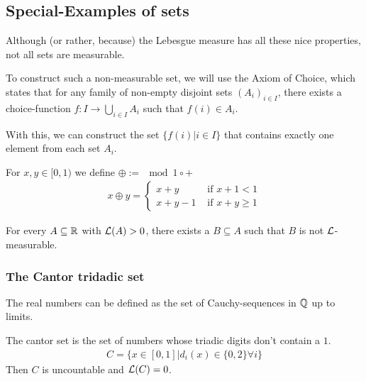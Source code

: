\subsection{Special-Examples of sets}
Although (or rather, because) the Lebesgue measure has all these nice properties, not all sets are measurable.

To construct such a non-measurable set, we will use the Axiom of Choice, which states that for any family of non-empty disjoint sets $(A_i)_{i \in I}$, there exists a choice-function $f: I \to \bigcup_{i \in I} A_i$ such that $f(i) \in A_i$.

With this, we can construct the set $\{f(i) \big\vert i \in I\}$ that contains exactly one element from each set $A_i$.

For $x,y \in [0,1)$ we define $\oplus := \mod 1 \circ +$
\begin{align*}
  x \oplus y = \left\{\begin{array}{ll}
    x+y & \text{ if } x + 1 < 1\\
    x + y - 1 & \text{ if } x + y \geq 1
  \end{array} \right.
\end{align*}


\begin{ex}[]
  For every $A \subseteq \mathbb{R}$ with $\mathcal{L}(A) > 0$, there exists a $B \subseteq A$ such that $B$ is not $\mathcal{L}$-measurable.
\end{ex}

\subsubsection*{The Cantor tridadic set}

The real numbers can be defined as the set of Cauchy-sequences in $\mathbb{Q}$ up to limits.

The cantor set is the set of numbers whose triadic digits don't contain a $1$.
\begin{align*}
  C = \{x \in [0,1] \big\vert d_i(x) \in \{0,2\} \forall i\}
\end{align*}
Then $C$ is uncountable and $\mathcal{L}(C) = 0$.


